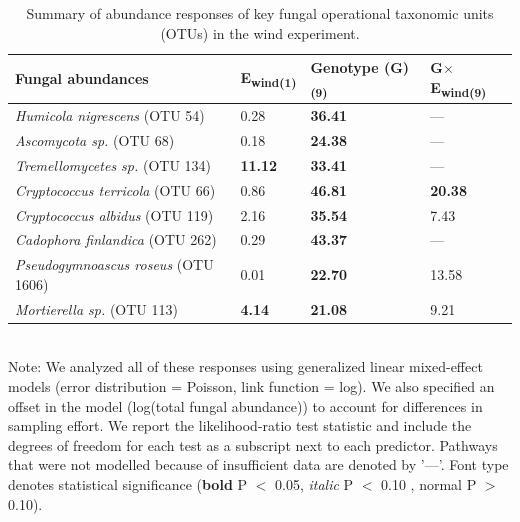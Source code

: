 \documentclass[11pt]{article}
\begin{document}
\begin{table}
\centering
\caption{Summary of abundance responses of key fungal
operational taxonomic units (OTUs) in the wind experiment.}
\label{wFungGuild}
\begin{tabular}{@{}llll@{}}
\toprule
Fungal abundances &
E\textsubscript{wind(1)} & Genotype (G)\textsubscript{(9)} & G$\times$E\textsubscript{wind(9)} \tabularnewline
\midrule
\textit{Humicola nigrescens} (OTU 54) & 0.28 & \textbf{36.41} & --- \tabularnewline
\textit{Ascomycota sp.} (OTU 68) & 0.18 & \textbf{24.38} & --- \tabularnewline
\textit{Tremellomycetes sp.} (OTU 134) & \textbf{11.12} & \textbf{33.41} & ---\tabularnewline
\textit{Cryptococcus terricola} (OTU 66) & 0.86 & \textbf{46.81} & \textbf{20.38} \tabularnewline
\textit{Cryptococcus albidus} (OTU 119) & 2.16 & \textbf{35.54} & 7.43 \tabularnewline
\textit{Cadophora finlandica} (OTU 262) & 0.29 & \textbf{43.37} & --- \tabularnewline
\textit{Pseudogymnoascus roseus} (OTU 1606) & 0.01 & \textbf{22.70} & 13.58 \tabularnewline
\textit{Mortierella sp.} (OTU 113) & \textbf{4.14} & \textbf{21.08} & 9.21 \tabularnewline
\bottomrule
\end{tabular}
\bigskip{} 
\\
{\footnotesize Note: We analyzed all of these responses
using generalized linear mixed-effect models (error distribution = Poisson, link function = log). We also specified an offset in the model (log(total fungal abundance)) to account for differences in sampling effort. We report the likelihood-ratio test statistic and include the degrees of freedom for each test as a subscript next to each predictor. Pathways that were not modelled because of insufficient data are denoted by '---'. Font type denotes statistical significance (\textbf{bold} P $<$ 0.05, \textit{italic} P $<$ 0.10 , normal P $>$ 0.10).}
\end{table}
 
\end{document}
